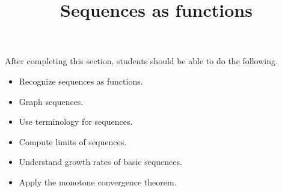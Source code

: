\documentclass{ximera}
\title{Sequences as functions}
\begin{document}
\begin{abstract}
\end{abstract}

\maketitle

\begin{sectionOutcomes}

After completing this section, students should be able to do the following.

\begin{itemize}
\item Recognize sequences as functions.
\item Graph sequences. 
\item Use terminology for sequences.
\item Compute limits of sequences.
\item Understand growth rates of basic sequences.
\item Apply the monotone convergence theorem.
\end{itemize}

\end{sectionOutcomes}
\end{document}
